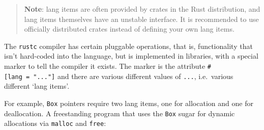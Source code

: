 \documentclass[a4paper,]{book}
\begin{document}
\begin{quote}
\textbf{Note}: lang items are often provided by crates in the Rust
distribution, and lang items themselves have an unstable interface. It
is recommended to use officially distributed crates instead of defining
your own lang items.
\end{quote}

The \texttt{rustc} compiler has certain pluggable operations, that is,
functionality that isn't hard-coded into the language, but is
implemented in libraries, with a special marker to tell the compiler it
exists. The marker is the attribute \texttt{\#{[}lang\ =\ "..."{]}} and
there are various different values of \texttt{...}, i.e.~various
different `lang items'.

For example, \texttt{Box} pointers require two lang items, one for
allocation and one for deallocation. A freestanding program that uses
the \texttt{Box} sugar for dynamic allocations via \texttt{malloc} and
\texttt{free}:
\end{document}
